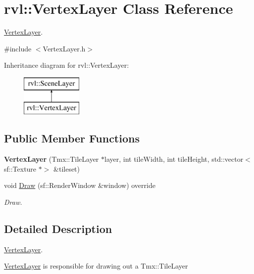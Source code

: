 \hypertarget{classrvl_1_1_vertex_layer}{}\section{rvl\+:\+:Vertex\+Layer Class Reference}
\label{classrvl_1_1_vertex_layer}


\hyperlink{classrvl_1_1_vertex_layer}{Vertex\+Layer}.  




{\ttfamily \#include $<$Vertex\+Layer.\+h$>$}

Inheritance diagram for rvl\+:\+:Vertex\+Layer\+:\begin{figure}[H]
\begin{center}
\leavevmode
\includegraphics[height=2.000000cm]{classrvl_1_1_vertex_layer}
\end{center}
\end{figure}
\subsection*{Public Member Functions}
\begin{DoxyCompactItemize}
\item 
\mbox{\label{classrvl_1_1_vertex_layer_aa6b21bdf5910c1afba2b6080f7555d64}} 
{\bfseries Vertex\+Layer} (Tmx\+::\+Tile\+Layer $\ast$layer, int tile\+Width, int tile\+Height, std\+::vector$<$ sf\+::\+Texture $\ast$$>$ \&tileset)
\item 
void \hyperlink{classrvl_1_1_vertex_layer_aa6c20822af0bcbf0c57329348b92c0b4}{Draw} (sf\+::\+Render\+Window \&window) override
\begin{DoxyCompactList}\small\item\em Draw. \end{DoxyCompactList}\end{DoxyCompactItemize}


\subsection{Detailed Description}
\hyperlink{classrvl_1_1_vertex_layer}{Vertex\+Layer}. 

\hyperlink{classrvl_1_1_vertex_layer}{Vertex\+Layer} is responsible for drawing out a Tmx\+::\+Tile\+Layer 

